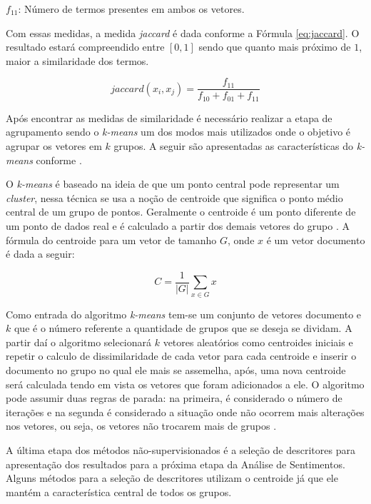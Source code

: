 $f_{11}$: Número de termos presentes em ambos os vetores.

Com essas medidas, a medida \textit{jaccard} é dada conforme a Fórmula \ref{eq:jaccard}. O resultado estará compreendido entre $\left [ 0,1 \right ]$ sendo que quanto mais próximo de $1$, maior a similaridade dos termos.

\begin{equation}
    \label{eq:jaccard}
     jaccard(x_{i},x_{j}) = \frac{f_{11} }{f_{10} +f_{01}  + f_{11} }
\end{equation}

Após encontrar as medidas de similaridade é necessário  realizar a etapa de agrupamento sendo o \textit{k-means} um dos modos mais utilizados onde o objetivo é agrupar os vetores em $k$ grupos. A seguir são apresentadas as características do \textit{k-means} conforme  .

O \textit{k-means} é baseado na ideia de que um ponto central pode representar um \textit{cluster}, nessa técnica se usa a noção de centroide que significa o ponto médio central de um grupo de pontos. Geralmente o centroide é um ponto diferente de um ponto de dados real e é calculado a partir dos demais vetores do grupo \cite{Steinbach00acomparison}. A fórmula do centroide para um vetor de tamanho $G$, onde $x$ é um vetor documento é dada a seguir:

\begin{equation}
    \label{eq:centroide}
     C=\frac{1}{|G|}\sum_{x \in G}x
\end{equation}

Como entrada do algoritmo \textit{k-means} tem-se um conjunto de vetores documento e $k$ que é o número referente a quantidade de grupos que se deseja se dividam. A partir daí o algoritmo selecionará $k$ vetores aleatórios como centroides iniciais e repetir o calculo de dissimilaridade de cada vetor para cada centroide e inserir o documento no grupo no qual ele mais se assemelha, após, uma nova centroide será calculada tendo em vista os vetores que foram adicionados a ele. O algoritmo pode assumir duas regras de parada: na primeira, é considerado o número de iterações e na segunda é considerado a situação onde não ocorrem mais alterações nos vetores, ou seja, os vetores não trocarem mais de grupos \cite{Steinbach00acomparison}.

A última etapa dos métodos não-supervisionados é a seleção de descritores para apresentação dos resultados para a próxima etapa da Análise de Sentimentos. Alguns métodos para a seleção de descritores utilizam o centroide já que ele mantém a característica central de todos os grupos.

